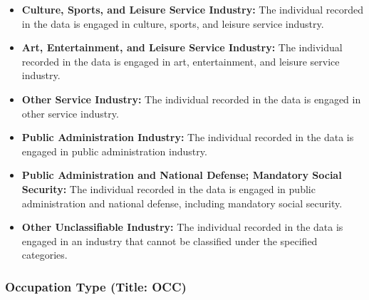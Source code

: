 \documentclass[twocolumn]{article}
\begin{document}
\begin{itemize}
    \item \textbf{Culture, Sports, and Leisure Service Industry:} The individual recorded in the data is engaged in culture, sports, and leisure service industry.
    \item \textbf{Art, Entertainment, and Leisure Service Industry:} The individual recorded in the data is engaged in art, entertainment, and leisure service industry.
    \item \textbf{Other Service Industry:} The individual recorded in the data is engaged in other service industry.
    \item \textbf{Public Administration Industry:} The individual recorded in the data is engaged in public administration industry.
    \item \textbf{Public Administration and National Defense; Mandatory Social Security:} The individual recorded in the data is engaged in public administration and national defense, including mandatory social security.
    \item \textbf{Other Unclassifiable Industry:} The individual recorded in the data is engaged in an industry that cannot be classified under the specified categories.
\end{itemize}

	\subsubsection{Occupation Type (Title: OCC)}
\end{document}
